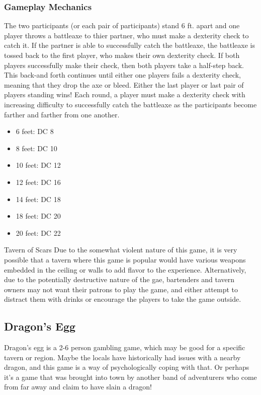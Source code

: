 \documentclass[10pt,a4paper,twoside,twocolumn,openany,nodeprecatedcode]{dndarticle}
\begin{document}
\subsubsection{Gameplay Mechanics}
The two participants (or each pair of participants) stand 6 ft. apart and one player throws a battleaxe to thier partner, who must make a dexterity check to catch it. If the partner is able to successfully catch the battleaxe, the battleaxe is tossed back to the first player, who makes their own dexterity check. If both players successfully make their check, then both players take a half-step back. This back-and forth continues until either one players fails a dexterity check, meaning that they drop the axe or bleed. Either the last player or last pair of players standing wins!
Each round, a player must make a dexterity check with increasing difficulty to successfully catch the battleaxe as the participants become farther and farther from one another.
\begin{itemize}

\item 6 feet: DC 8
\item 8 feet: DC 10
\item 10 feet: DC 12
\item 12 feet: DC 16
\item 14 feet: DC 18
\item 18 feet: DC 20
\item 20 feet: DC 22
\end{itemize}


\begin{DndComment}{Tavern of Scars}
Due to the somewhat violent nature of this game, it is very possible that a tavern where this game is popular would have various weapons embedded in the ceiling or walls to add flavor to the experience. Alternatively, due to the potentially destructive nature of the gae, bartenders and tavern owners may not want their patrons to play the game, and either attempt to distract them with drinks or encourage the players to take the game outside.
\end{DndComment}

\subsection{Dragon's Egg}
Dragon's egg is a 2-6 person gambling game, which may be good for a specific tavern or region. Maybe the locals have historically had issues with a nearby dragon, and this game is a way of psychologically coping with that. Or perhaps it's a game that was brought into town by another band of adventurers who come from far away and claim to have slain a dragon!
\end{document}
